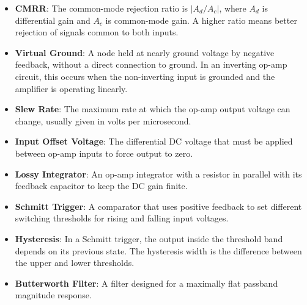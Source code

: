 \documentclass[12pt,a4paper]{article}
\begin{document}
\begin{tcolorbox}[defbox, title={One-Line Definitions}, title after break={One-Line Definitions (contd.)}]
\small
{}
\begin{itemize}[leftmargin=1.5em, topsep=2pt, itemsep=4pt]
  \item \textbf{CMRR}: The common-mode rejection ratio is $\lvert A_d/A_c\rvert$, where $A_d$ is differential gain and $A_c$ is common-mode gain. A higher ratio means better rejection of signals common to both inputs.
  \item \textbf{Virtual Ground}: A node held at nearly ground voltage by negative feedback, without a direct connection to ground. In an inverting op-amp circuit, this occurs when the non-inverting input is grounded and the amplifier is operating linearly.
  \item \textbf{Slew Rate}: The maximum rate at which the op-amp output voltage can change, usually given in volts per microsecond.
  \item \textbf{Input Offset Voltage}: The differential DC voltage that must be applied between op-amp inputs to force output to zero.
  \item \textbf{Lossy Integrator}: An op-amp integrator with a resistor in parallel with its feedback capacitor to keep the DC gain finite.
  \item \textbf{Schmitt Trigger}: A comparator that uses positive feedback to set different switching thresholds for rising and falling input voltages.
  \item \textbf{Hysteresis}: In a Schmitt trigger, the output inside the threshold band depends on its previous state. The hysteresis width is the difference between the upper and lower thresholds.
  \item \textbf{Butterworth Filter}: A filter designed for a maximally flat passband magnitude response.
\end{itemize}
\end{tcolorbox}
\end{document}
